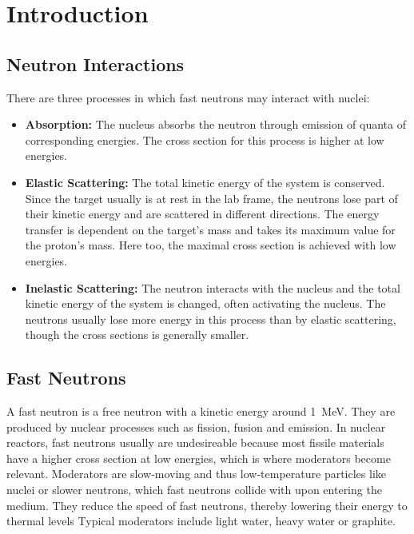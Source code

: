 \chapter{Introduction}
\section{Neutron Interactions}\label{sec:inter}
There are three processes in which fast neutrons may interact with nuclei:
\begin{itemize}
	\item \textbf{Absorption:} The nucleus absorbs the neutron through emission of quanta of corresponding energies.
	The cross section for this process is higher at low energies.
	\item \textbf{Elastic Scattering:} The total kinetic energy of the system is conserved.
	Since the target usually is at rest in the lab frame, the neutrons lose part of their kinetic energy and are scattered in different directions.
	The energy transfer is dependent on the target's mass and takes its maximum value for the proton's mass.
	Here too, the maximal cross section is achieved with low energies.
	\item \textbf{Inelastic Scattering:} The neutron interacts with the nucleus and the total kinetic energy of the system is changed, often activating the nucleus.
	The neutrons usually lose more energy in this process than by elastic scattering, though the cross sections is generally smaller.
\end{itemize}

\section{Fast Neutrons}
A fast neutron is a free neutron with a kinetic energy around \SI{1}{MeV}.
They are produced by nuclear processes such as fission, fusion and emission.
In nuclear reactors, fast neutrons usually are undesireable because most fissile materials have a higher cross section at low energies, which is where moderators become relevant.
Moderators are slow-moving and thus low-temperature particles like nuclei or slower neutrons, which fast neutrons collide with upon entering the medium.
They reduce the speed of fast neutrons, thereby lowering their energy to thermal levels
Typical moderators include light water, heavy water or graphite.

